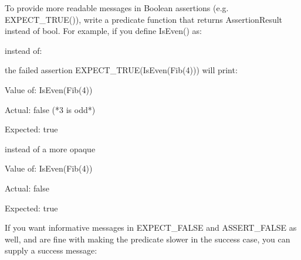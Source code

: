 To provide more readable messages in Boolean assertions (e.\+g. {\ttfamily E\+X\+P\+E\+C\+T\+\_\+\+T\+R\+U\+E()}), write a predicate function that returns {\ttfamily Assertion\+Result} instead of {\ttfamily bool}. For example, if you define {\ttfamily Is\+Even()} as\+:


\begin{DoxyCode}{0}
\DoxyCodeLine{\}}
\end{DoxyCode}


instead of\+:


\begin{DoxyCode}{0}
\DoxyCodeLine{\}}
\end{DoxyCode}


the failed assertion {\ttfamily E\+X\+P\+E\+C\+T\+\_\+\+T\+R\+UE(Is\+Even(\+Fib(4)))} will print\+:


\begin{DoxyPre}
Value of: IsEven(Fib(4))~\newline

Actual: false (*3 is odd*)~\newline

Expected: true~\newline

\end{DoxyPre}


instead of a more opaque


\begin{DoxyPre}
Value of: IsEven(Fib(4))~\newline

Actual: false~\newline

Expected: true~\newline

\end{DoxyPre}


If you want informative messages in {\ttfamily E\+X\+P\+E\+C\+T\+\_\+\+F\+A\+L\+SE} and {\ttfamily A\+S\+S\+E\+R\+T\+\_\+\+F\+A\+L\+SE} as well, and are fine with making the predicate slower in the success case, you can supply a success message\+:


\begin{DoxyCode}{0}
\DoxyCodeLine{\}}
\end{DoxyCode}


